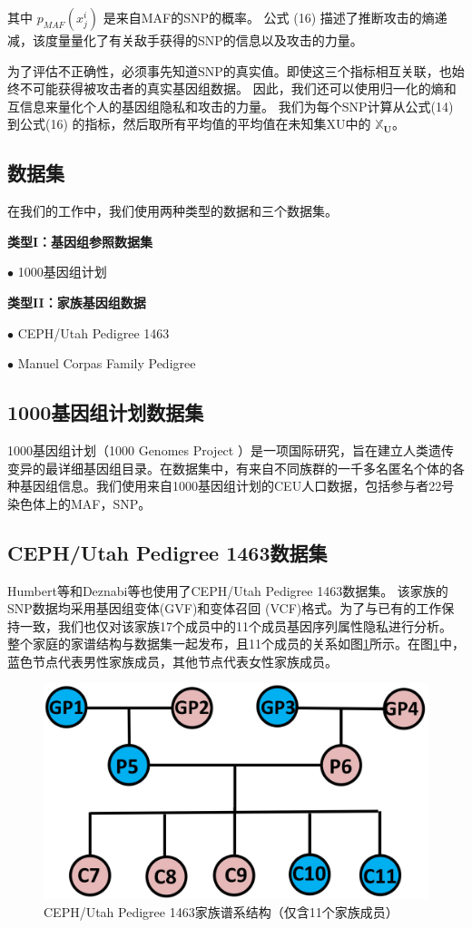 其中 $p_{MAF}(x^i_j)$ 是来自MAF的SNP的概率。 公式 (16) 描述了推断攻击的熵递减，该度量量化了有关敌手获得的SNP的信息以及攻击的力量。

为了评估不正确性，必须事先知道SNP的真实值。即使这三个指标相互关联，也始终不可能获得被攻击者的真实基因组数据。 因此，我们还可以使用归一化的熵和互信息来量化个人的基因组隐私和攻击的力量。
我们为每个SNP计算从公式(14) 到公式(16) 的指标，然后取所有平均值的平均值在未知集XU中的 $\mathbb{X}_{\mathbf{U}}$。


\subsection{数据集}

在我们的工作中，我们使用两种类型的数据和三个数据集。

\textbf{类型I：基因组参照数据集}

$\bullet$ 1000基因组计划


\textbf{类型II：家族基因组数据}


$\bullet$ CEPH/Utah Pedigree 1463 

$\bullet$ Manuel Corpas Family Pedigree 

\subsection{1000基因组计划数据集}

1000基因组计划（1000 Genomes Project ）是一项国际研究，旨在建立人类遗传变异的最详细基因组目录。在数据集中，有来自不同族群的一千多名匿名个体的各种基因组信息。我们使用来自1000基因组计划的CEU人口数据，包括参与者22号染色体上的MAF，SNP。

\subsection{CEPH/Utah Pedigree 1463数据集}

Humbert等\cite{humbert2013addressing,humbert2017quantifying}和Deznabi等\cite{deznabi2018inference}也使用了CEPH/Utah Pedigree 1463数据集\cite{drmanac2010human}。
该家族的SNP数据均采用基因组变体(GVF)和变体召回 (VCF)格式。为了与已有的工作保持一致，我们也仅对该家族17个成员中的11个成员基因序列属性隐私进行分析。 整个家庭的家谱结构与数据集一起发布，且11个成员的关系如图\ref{fig:CEPH-Utah-Pedigree}所示。在图\ref{fig:CEPH-Utah-Pedigree}中，蓝色节点代表男性家族成员，其他节点代表女性家族成员。

\begin{figure}[htbp]
	\centering
	\includegraphics[width=0.6\linewidth]{./figures/CEPH-Utah-Pedigree.jpg}
	\centering
	\caption{CEPH/Utah Pedigree 1463家族谱系结构（仅含11个家族成员）}\label{fig:CEPH-Utah-Pedigree}
\end{figure}

